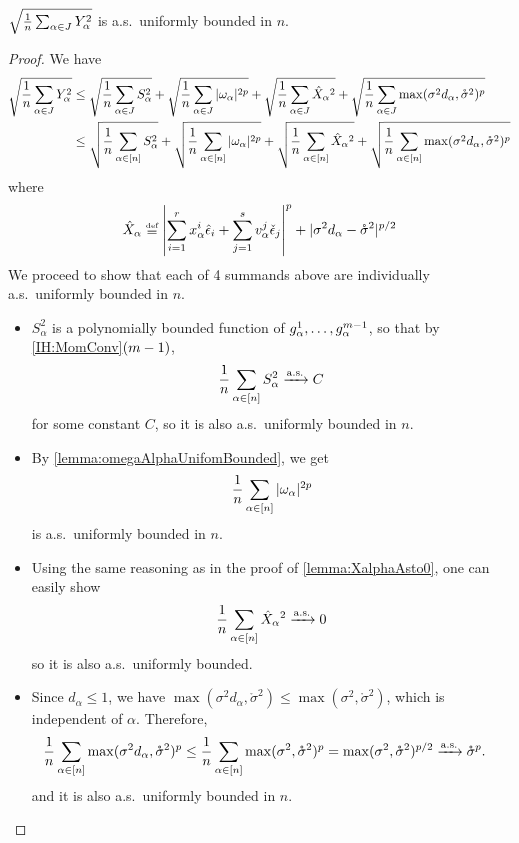 \documentclass[main.tex]{subfiles}
\begin{document}
\begin{lemma}\label{lemma:YAlphaUnifBounded}
$\sqrt{\frac{1}{n} \sum_{\alpha \in J} Y_\alpha^2}$ is a.s.\ uniformly bounded in $n$.
\end{lemma}
\begin{proof}
  \newcommand{\XX}{\hat{X}}
  We have
  \begin{align*}
  \sqrt{\f 1 n \sum_{\alpha \in \JJc} Y_\alpha^2}
      &\le
          \sqrt{\f 1 n \sum_{\alpha \in \JJc} S_\alpha^2}
          + \sqrt{\f 1 n \sum_{\alpha \in \JJc} |\omega_\alpha|^{2p}}
          + \sqrt{\f 1 n \sum_{\alpha \in \JJc} \XX_\alpha{}^2}
          + \sqrt{\f 1 n \sum_{\alpha \in \JJc} \max(\sigma^2 d_\alpha, \mathring \sigma^2)^p}
          \\
      &\le
          \sqrt{\f 1 n \sum_{\alpha \in [n]} S_\alpha^2}
          + \sqrt{\f 1 n \sum_{\alpha \in [n]} |\omega_\alpha|^{2p}}
          + \sqrt{\f 1 n \sum_{\alpha \in [n]} \XX_\alpha{}^2}
          + \sqrt{\f 1 n \sum_{\alpha \in [n]} \max(\sigma^2 d_\alpha, \mathring \sigma^2)^p}
  \end{align*}
  where
  \[\XX_\alpha \defeq \left|\sum_{i=1}^r \xme_\alpha^i \hat \epsilon_i
                  + \sum_{j=1}^s \vme_\alpha^j \check \epsilon_j
          \right|^p
          + |\sigma^2 d_\alpha - \mathring \sigma^2|^{p/2}
  \]
  We proceed to show that each of 4 summands above are individually a.s.\ uniformly bounded in $n$.
  \begin{itemize}
  \item
      $S_\alpha^2$ is a polynomially bounded function of $g^1_\alpha, \ldots, g^{m-1}_\alpha$, so that by \ref{IH:MomConv}$(m-1)$,
      \[\frac{1}{n} \sum_{\alpha \in [n]} S_\alpha^2 \xrightarrow{\mathrm{a.s.}} C\]
      for some constant $C$, so it is also a.s.\ uniformly bounded in $n$.
  \item
      By \cref{lemma:omegaAlphaUnifomBounded}, we get
      \begin{equation*}
      \frac{1}{n} \sum_{\alpha \in [n]} |\omega_\alpha|^{2p}
      \end{equation*}
      is a.s.\ uniformly bounded in $n$.
  \item
      Using the same reasoning as in the proof of \cref{lemma:XalphaAsto0}, one can easily show
      \[
      \f 1 n \sum_{\alpha \in [n]} \XX_\alpha{}^2 \asto 0
      \]
      so it is also a.s.\ uniformly bounded. 
  \item
      Since $d_\alpha \le 1$, we have $\max(\sigma^2 d_\alpha, \mathring\sigma^2) \le \max(\sigma^2, \mathring \sigma^2)$, which is independent of $\alpha$.
      Therefore,
      \begin{align*}
      \frac{1}{n} \sum_{\alpha \in [n]} \max(\sigma^2 d_\alpha, \mathring \sigma^2)^p
      &\le
          \frac{1}{n} \sum_{\alpha \in [n]} \max(\sigma^2, \mathring \sigma^2)^p
      =
          \max(\sigma^2, \mathring \sigma^2)^{p/2}
      \xrightarrow{\mathrm{a.s.}} \mathring \sigma^p.
      \end{align*}
      and it is also a.s.\ uniformly bounded in $n$.
  \end{itemize}
  
  
\end{proof}
  
\end{document}

